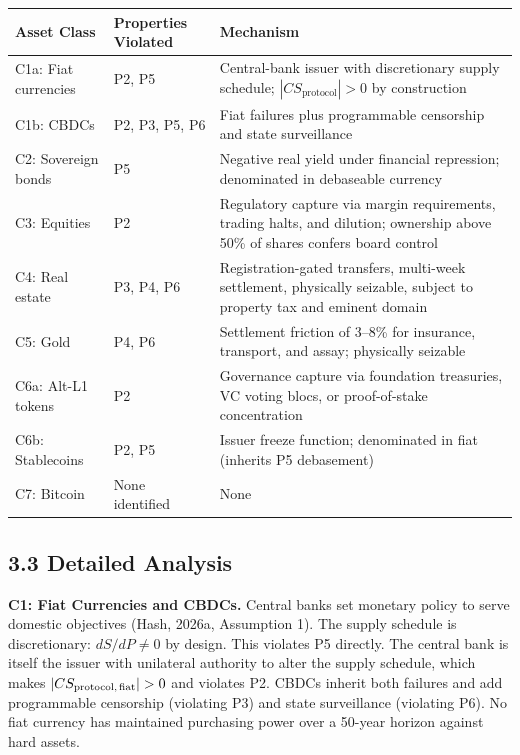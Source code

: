 \documentclass[12pt]{article}
\theoremstyle{definition}
\theoremstyle{remark}
\begin{document}
\begin{table}[h]
\centering
\begin{tabularx}{\textwidth}{llX}
\toprule
Asset Class & Properties Violated & Mechanism \\
\midrule
C1a: Fiat currencies & P2, P5 & Central-bank issuer with discretionary supply schedule; $|CS_\text{protocol}| > 0$ by construction \\
C1b: CBDCs & P2, P3, P5, P6 & Fiat failures plus programmable censorship and state surveillance \\
C2: Sovereign bonds & P5 & Negative real yield under financial repression; denominated in debaseable currency \\
C3: Equities & P2 & Regulatory capture via margin requirements, trading halts, and dilution; ownership above 50\% of shares confers board control \\
C4: Real estate & P3, P4, P6 & Registration-gated transfers, multi-week settlement, physically seizable, subject to property tax and eminent domain \\
C5: Gold & P4, P6 & Settlement friction of 3--8\% for insurance, transport, and assay; physically seizable \\
C6a: Alt-L1 tokens & P2 & Governance capture via foundation treasuries, VC voting blocs, or proof-of-stake concentration \\
C6b: Stablecoins & P2, P5 & Issuer freeze function; denominated in fiat (inherits P5 debasement) \\
C7: Bitcoin & None identified & None \\
\bottomrule
\end{tabularx}
\end{table}

\subsection{3.3 Detailed Analysis}

\noindent\textbf{C1: Fiat Currencies and CBDCs.} Central banks set
monetary policy to serve domestic objectives (Hash, 2026a, Assumption
1). The supply schedule is discretionary: $dS/dP \neq 0$ by design.
This violates P5 directly. The central bank is itself the issuer with
unilateral authority to alter the supply schedule, which makes
$|CS_\text{protocol,\,fiat}| > 0$ and violates P2. CBDCs inherit both
failures and add programmable censorship (violating P3) and state
surveillance (violating P6). No fiat currency has maintained purchasing
power over a 50-year horizon against hard assets.
\end{document}
